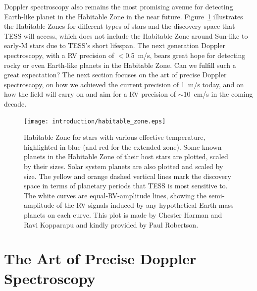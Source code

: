 Doppler spectroscopy also remains the most promising avenue for
detecting Earth-like planet in the Habitable Zone
\citep{1993Icar..101..108K, 2013ApJ...765..131K} in the near
future. Figure~\ref{intro:fig:hz} illustrates the Habitable Zones for
different types of stars and the discovery space that TESS will
access, which does not include the Habitable Zone around Sun-like to
early-M stars due to TESS's short lifespan. The next generation
Doppler spectroscopy, with a RV precision of $<$0.5~m/s, bears great
hope for detecting rocky or even Earth-like planets in the Habitable
Zone. Can we fulfill such a great expectation? The next section
focuses on the art of precise Doppler spectroscopy, on how we achieved
the current precision of 1~m/s today, and on how the field will carry
on and aim for a RV precision of $\sim 10$~cm/s in the coming decade.


\begin{figure}
\centering
\texttt{[image: introduction/habitable\_zone.eps]}
\caption{Habitable Zone for stars with various effective temperature,
  highlighted in blue (and red for the extended zone). Some known
  planets in the Habitable Zone of their host stars are plotted, scaled
  by their sizes. Solar system planets are also plotted and scaled by
  size. The yellow and orange dashed vertical lines mark the discovery
  space in terms of planetary periods that TESS is most sensitive
  to. The white curves are equal-RV-amplitude lines, showing the
  semi-amplitude of the RV signals induced by any hypothetical
  Earth-mass planets on each curve. This plot is made by Chester Harman
  and Ravi Kopparapu and kindly provided by Paul Robertson.
\label{intro:fig:hz}}
\end{figure}



\section{The Art of Precise Doppler Spectroscopy}

